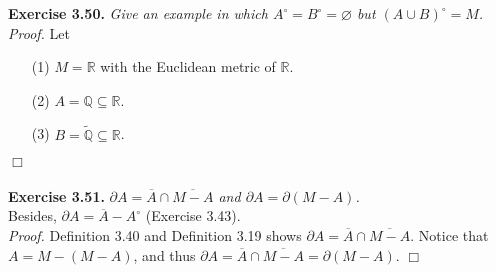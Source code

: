 \documentclass{article}
\begin{document}



\textbf{Exercise 3.50.}
\emph{Give an example in which $A^{\circ} = B^{\circ} = \varnothing$ but
$(A \cup B)^{\circ} = M$. } \\

\emph{Proof.}
Let
\begin{enumerate}
\item[(1)]
$M = \mathbb{R}$ with the Euclidean metric of $\mathbb{R}$.
\item[(2)]
$A = \mathbb{Q} \subseteq \mathbb{R}$.
\item[(3)]
$B = \widetilde{\mathbb{Q}} \subseteq \mathbb{R}$.
\end{enumerate}
$\Box$ \\\\






\textbf{Exercise 3.51.}
\emph{$\partial A = \overline{A} \cap \overline{M-A}$ and
$\partial A = \partial(M - A)$.} \\

Besides, $\partial A = \overline{A} - A^{\circ}$ (Exercise 3.43). \\

\emph{Proof.}
Definition 3.40 and Definition 3.19 shows $\partial A = \overline{A} \cap \overline{M-A}$.
Notice that $A = M - (M-A)$, and thus
$\partial A = \overline{A} \cap \overline{M-A} = \partial(M - A)$.
$\Box$ \\\\



\end{document}

